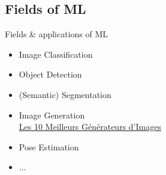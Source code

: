 \documentclass[10pt,serif,mathserif,compress,hyperref={colorlinks}]{beamer}
\begin{document}
\subsection{Fields of ML}

\begin{frame}{Fields \& applications of ML}

  \begin{tcolorbox}[height=6cm, add to width=.7cm, title=Computer Vision]
    \begin{minipage}[t][][t]{.6\textwidth}
      \begin{itemize}
      \item<1-> Image Classification
      \item<2-> Object Detection 
      \item<3-> (Semantic) Segmentation
      \item<4-> Image Generation\\
        {\small \href{https://www.leptidigital.fr/productivite/meilleurs-generateurs-images-ia-30857/}{Les 10 Meilleurs Générateurs d’Images}}
      \item<5-> Pose Estimation
      \item<5-> ...
      \end{itemize}
    \end{minipage}\begin{minipage}[t][][b]{.4\textwidth}

\end{minipage}
\end{tcolorbox}
\end{frame}
\end{document}
